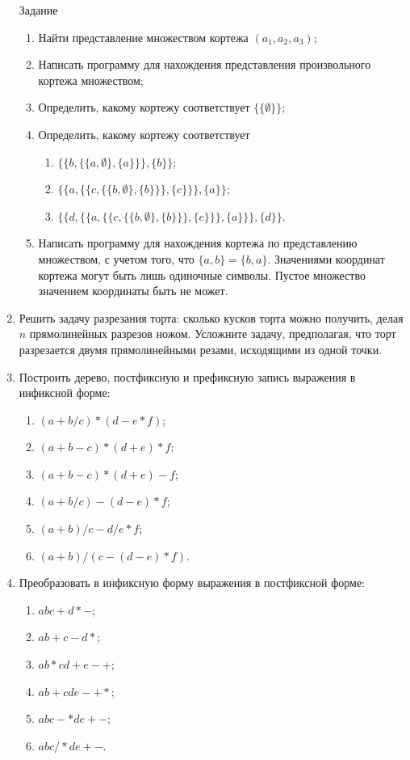 \begin{enumerate}
    Задание
    \begin{enumerate}
        \item Найти представление множеством кортежа $(a_1,a_2,a_3)$;
        \item Написать программу для нахождения представления произвольного кортежа множеством;
        \item Определить, какому кортежу соответствует $\{\{\emptyset\}\}$;
        \item Определить, какому кортежу соответствует 
        \begin{enumerate}
            \item $\{\{b,\{\{a,\emptyset\},\{a\}\}\},\{b\}\}$;
            \item $\{\{a,\{\{c,\{\{b,\emptyset\},\{b\}\}\},\{c\}\}\},\{a\}\}$;
            \item $\{\{d,\{\{a,\{\{c,\{\{b,\emptyset\},\{b\}\}\},\{c\}\}\},\{a\}\}\},\{d\}\}$.
        \end{enumerate} 
        \item Написать программу для нахождения кортежа по представлению множеством, с учетом того, что $\{a,b\}=\{b,a\}$. Значениями координат кортежа могут быть лишь одиночные символы. Пустое множество значением координаты быть не может.
    \end{enumerate}
    
    \item Решить задачу разрезания торта: сколько кусков торта можно получить, делая $n$ прямолинейных разрезов ножом. Усложните задачу, предполагая, что торт разрезается двумя прямолинейными резами, исходящими из одной точки.
    
    \item Построить дерево, постфиксную и префиксную запись выражения в инфиксной форме:
    \begin{enumerate}
        \item $(a+b/c)*(d-e*f)$;
        \item $(a+b-c)*(d+e)*f$;
        \item $(a+b-c)*(d+e)-f$;
        \item $(a+b/c)-(d-e)*f$;
        \item $(a+b)/c-d/e*f$;
        \item $(a+b)/(c-(d-e)*f)$.
    \end{enumerate}
    
    \item Преобразовать в инфиксную форму выражения в постфиксной форме:
    \begin{enumerate}
        \item $abc+d*-$;
        \item $ab+c-d*$;
        \item $ab*cd+e-+$;
        \item $ab+cde-+*$;
        \item $abc-*de+-$;
        \item $abc/*de+-$.
    \end{enumerate}


\end{enumerate}
